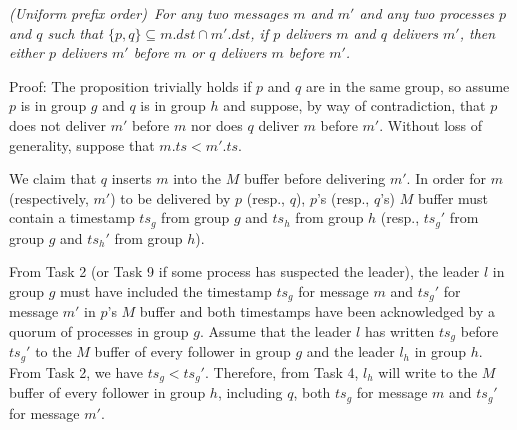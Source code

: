 \vspace{2mm}
\begin{proposition}
  \textit{(Uniform prefix order)~For any two messages $m$ and $m'$ and any two processes $p$ and $q$ such that $\lbrace p, q\rbrace \subseteq m.\mathit{dst} \cap m'.\mathit{dst}$, if $p$ delivers $m$ and $q$ delivers $m'$, then either $p$ delivers $m'$ before $m$ or $q$ delivers $m$ before $m'$.}
\end{proposition}
\noindent
{\sc Proof:} 
The proposition trivially holds if $p$ and $q$ are in the same group, so assume $p$ is in group $g$ and $q$ is in group $h$ and suppose, by way of contradiction, that $p$ does not deliver $m'$ before $m$ nor does $q$ deliver $m$ before $m'$. 
Without loss of generality, suppose that $m.ts < m'.ts$. 

We claim that $q$ inserts $m$ into the $M$ buffer before delivering $m'$. 
In order for $m$ (respectively, $m'$) to be delivered by $p$ (resp., $q$), $p$'s (resp., $q$'s) $M$ buffer must contain a timestamp $ts_g$ from group $g$ and $ts_h$ from group $h$ (resp., $ts_g'$ from group $g$ and $ts_h'$ from group $h$).

From Task 2 (or Task 9 if some process has suspected the leader), the leader $l$ in group $g$ must have included the timestamp $ts_g$ for message $m$ and $ts_g'$ for message $m'$ in $p$'s $M$ buffer and both timestamps have been acknowledged by a quorum of processes in group $g$.
Assume that the leader $l$ has written $ts_g$ before $ts_g'$ to the $M$ buffer of every follower in group $g$ and the leader $l_h$ in group $h$. 
From Task 2, we have $ts_g < ts_g'$.
Therefore, from Task 4, $l_h$ will write to the $M$ buffer of every follower in group $h$, including $q$, both $ts_g$ for message $m$ and $ts_g'$ for message $m'$.


